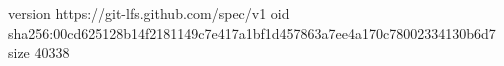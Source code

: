 version https://git-lfs.github.com/spec/v1
oid sha256:00cd625128b14f2181149c7e417a1bf1d457863a7ee4a170c78002334130b6d7
size 40338
